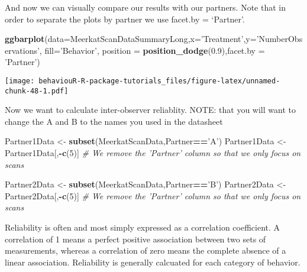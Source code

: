 \documentclass[]{book}
\newenvironment{Shaded}{\begin{snugshade}}{\end{snugshade}}
\newcommand{\CommentTok}[1]{\textcolor[rgb]{0.56,0.35,0.01}{\textit{#1}}}
\newcommand{\DataTypeTok}[1]{\textcolor[rgb]{0.13,0.29,0.53}{#1}}
\newcommand{\DecValTok}[1]{\textcolor[rgb]{0.00,0.00,0.81}{#1}}
\newcommand{\FloatTok}[1]{\textcolor[rgb]{0.00,0.00,0.81}{#1}}
\newcommand{\KeywordTok}[1]{\textcolor[rgb]{0.13,0.29,0.53}{\textbf{#1}}}
\newcommand{\NormalTok}[1]{#1}
\newcommand{\OperatorTok}[1]{\textcolor[rgb]{0.81,0.36,0.00}{\textbf{#1}}}
\newcommand{\StringTok}[1]{\textcolor[rgb]{0.31,0.60,0.02}{#1}}
\begin{document}
And now we can visually compare our results with our partners. Note that in order to separate the plots by partner we use facet.by = `Partner'.

\begin{Shaded}
\begin{Highlighting}[]
\KeywordTok{ggbarplot}\NormalTok{(}\DataTypeTok{data=}\NormalTok{MeerkatScanDataSummaryLong,}\DataTypeTok{x=}\StringTok{'Treatment'}\NormalTok{,}\DataTypeTok{y=}\StringTok{'NumberObservations'}\NormalTok{, }\DataTypeTok{fill=}\StringTok{'Behavior'}\NormalTok{,}
          \DataTypeTok{position =} \KeywordTok{position_dodge}\NormalTok{(}\FloatTok{0.9}\NormalTok{),}\DataTypeTok{facet.by =} \StringTok{'Partner'}\NormalTok{)}
\end{Highlighting}
\end{Shaded}

\texttt{[image: behaviouR-R-package-tutorials\_files/figure-latex/unnamed-chunk-48-1.pdf]}

Now we want to calculate inter-observer reliablity.
NOTE: that you will want to change the A and B to the names you used in the datasheet

\begin{Shaded}
\begin{Highlighting}[]
\NormalTok{Partner1Data <-}\StringTok{ }\KeywordTok{subset}\NormalTok{(MeerkatScanData,Partner}\OperatorTok{==}\StringTok{'A'}\NormalTok{)}
\NormalTok{Partner1Data <-}\StringTok{ }\NormalTok{Partner1Data[,}\OperatorTok{-}\KeywordTok{c}\NormalTok{(}\DecValTok{5}\NormalTok{)] }\CommentTok{# We remove the 'Partner' column so that we only focus on scans}

\NormalTok{Partner2Data <-}\StringTok{ }\KeywordTok{subset}\NormalTok{(MeerkatScanData,Partner}\OperatorTok{==}\StringTok{'B'}\NormalTok{)}
\NormalTok{Partner2Data <-}\StringTok{ }\NormalTok{Partner2Data[,}\OperatorTok{-}\KeywordTok{c}\NormalTok{(}\DecValTok{5}\NormalTok{)] }\CommentTok{# We remove the 'Partner' column so that we only focus on scans}
\end{Highlighting}
\end{Shaded}

Reliability is often and most simply expressed as a correlation coefficient. A correlation of 1 means a perfect positive association between two sets of measurements, whereas a correlation of zero means the complete absence of a linear association. Reliability is generally calcuated for each category of behavior.
\end{document}
